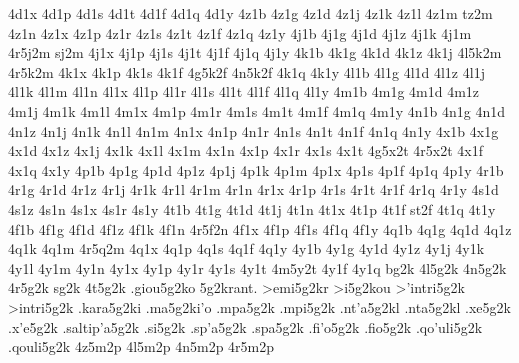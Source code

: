 {%
4d1x
4d1p
4d1s
4d1t
4d1f
4d1q
4d1y
4z1b %
4z1g %
4z1d
4z1j
4z1k
4z1l
4z1m
tz2m %
4z1n
4z1x
4z1p
4z1r
4z1s
4z1t
4z1f
4z1q
4z1y
4j1b
4j1g
4j1d
4j1z
4j1k
4j1m
4r5j2m %
sj2m   %
4j1x
4j1p
4j1s
4j1t
4j1f
4j1q
4j1y
4k1b %
4k1g
4k1d
4k1z
4k1j
4l5k2m %
4r5k2m %
4k1x
4k1p
4k1s
4k1f
4g5k2f %
4n5k2f %
4k1q
4k1y
4l1b
4l1g
4l1d
4l1z
4l1j
4l1k
4l1m
4l1n
4l1x
4l1p
4l1r
4l1s
4l1t
4l1f
4l1q
4l1y
4m1b
4m1g
4m1d
4m1z
4m1j
4m1k
4m1l
4m1x
4m1p
4m1r
4m1s
4m1t
4m1f
4m1q
4m1y
4n1b
4n1g
4n1d
4n1z
4n1j
4n1k
4n1l
4n1m
4n1x
4n1p
4n1r
4n1s
4n1t
4n1f
4n1q
4n1y
4x1b
4x1g
4x1d
4x1z
4x1j
4x1k
4x1l
4x1m
4x1n
4x1p
4x1r
4x1s
4x1t
4g5x2t %
4r5x2t %
4x1f
4x1q
4x1y
4p1b
4p1g
4p1d
4p1z
4p1j
4p1k
4p1m
4p1x
4p1s
4p1f
4p1q
4p1y
4r1b
4r1g
4r1d
4r1z
4r1j
4r1k
4r1l
4r1m
4r1n
4r1x
4r1p
4r1s
4r1t
4r1f
4r1q
4r1y
4s1d %
4s1z
4s1n %
4s1x
4s1r
4s1y
4t1b
4t1g
4t1d
4t1j
4t1n
4t1x
4t1p
4t1f
st2f %
4t1q
4t1y
4f1b
4f1g
4f1d
4f1z
4f1k %
4f1n
4r5f2n %
4f1x
4f1p
4f1s
4f1q
4f1y
4q1b
4q1g
4q1d
4q1z
4q1k
4q1m
4r5q2m %
4q1x
4q1p
4q1s
4q1f
4q1y
4y1b
4y1g
4y1d
4y1z
4y1j
4y1k
4y1l
4y1m
4y1n
4y1x
4y1p
4y1r
4y1s
4y1t
4m5y2t %
4y1f
4y1q
bg2k
4l5g2k
4n5g2k
4r5g2k
sg2k
4t5g2k
.giou5g2ko   %
5g2krant.    %
>emi5g2kr    %
>i5g2kou     %
>'intri5g2k  %
>intri5g2k
.kara5g2ki   %
.ma5g2ki'o   %
.mpa5g2k     %
.mpi5g2k     %
.nt'a5g2kl   %
.nta5g2kl    %
.xe5g2k      %
.x'e5g2k
.saltip'a5g2k %
.si5g2k      %
.sp'a5g2k    %
.spa5g2k
.fi'o5g2k    %
.fio5g2k
.qo'uli5g2k  %
.qouli5g2k
4z5m2p
4l5m2p
4n5m2p
4r5m2p
}

